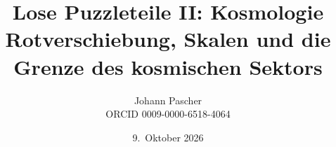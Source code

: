 \documentclass[11pt,a4paper]{report}
\title{Lose Puzzleteile II: Kosmologie\\[0.5em]
  \large Rotverschiebung, Skalen und die Grenze des kosmischen Sektors}
\date{9.~Oktober 2026}
\author{Johann Pascher\\\small ORCID 0009-0000-6518-4064}
\begin{document}
\renewcommand{\thechapter}{}
\renewcommand{\thesection}{\arabic{section}}
\maketitle
\tableofcontents

\end{document}
